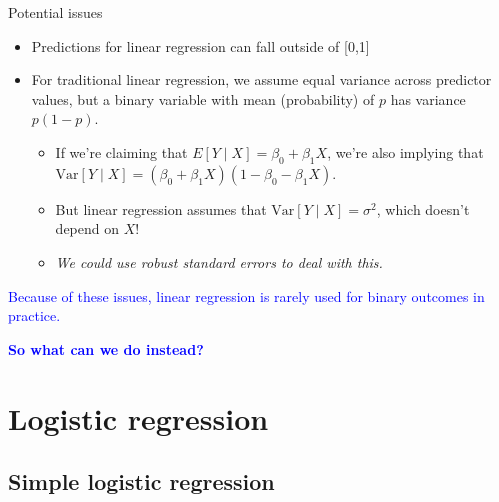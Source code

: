 \documentclass[10pt,t]{beamer}
\begin{document}
\begin{frame}{Potential issues}
	
	\begin{itemize}
	\item Predictions for linear regression can fall outside of [0,1]
	
	\medskip
	
	\item For traditional linear regression, we assume equal variance across predictor values, but a binary variable with mean (probability) of $p$ has variance $p(1-p)$. 
	\medskip
	\begin{itemize}
	\item  If we're claiming that $E[Y \mid X] = \beta_0 + \beta_1X$, we're also implying that $\text{Var}[Y \mid X] = (\beta_0 + \beta_1 X)(1 - \beta_0 - \beta_1 X)$. 
	\medskip
	
	\item But linear regression assumes that $\text{Var}[Y \mid X] = \sigma^2$, which doesn't depend on $X$!
	
	\medskip
	
	\item \textit{We could use robust standard errors to deal with this.}
	

	\end{itemize}
\end{itemize}
\medskip

\textcolor{blue}{Because of these issues, linear regression is rarely used for binary outcomes in practice.}

\medskip

\textcolor{blue}{\textbf{So what can we do instead?}}

\end{frame}


%
%
\section{Logistic regression}

\subsection{Simple logistic regression}
\end{document}
